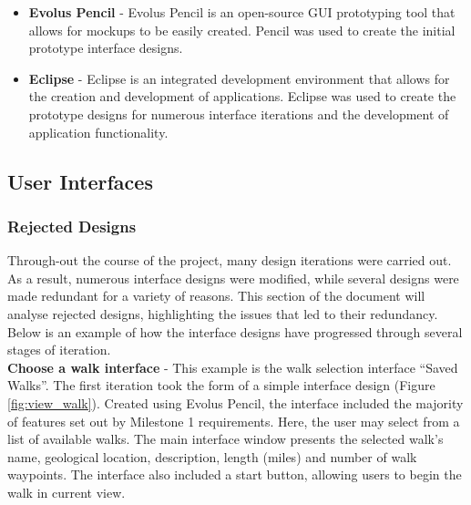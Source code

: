 \documentclass[11pt,a4paper]{report}
\begin{document}
\begin{itemize}

\item \textbf{Evolus Pencil} - Evolus Pencil is an open-source GUI prototyping tool that allows for mockups to be easily created. Pencil was used to create the initial prototype interface designs.

\item \textbf{Eclipse} - Eclipse is an integrated development environment that allows for the creation and development of applications. Eclipse was used to create the prototype designs for numerous interface iterations and the development of application functionality.

\end{itemize}

\subsection{User Interfaces}



\subsubsection{Rejected Designs}
\label{sec:rejected-designs}

Through-out the course of the project, many design iterations were carried out. As a result, numerous interface designs were modified, while several designs were made redundant for a variety of reasons. This section of the document will analyse rejected designs, highlighting the issues that led to their redundancy. Below is an example of how the interface designs have progressed through several stages of iteration.\\

\textbf{Choose a walk interface} - This example is the walk selection interface ``Saved Walks''. The first iteration took the form of a simple interface design (Figure \ref{fig:view_walk}). Created using Evolus Pencil, the interface included the majority of features set out by Milestone 1 requirements. Here, the user may select from a list of available walks. The main interface window presents the selected walk's name, geological location, description, length (miles) and number of walk waypoints. The interface also included a start button, allowing users to begin the walk in current view.
\end{document}
